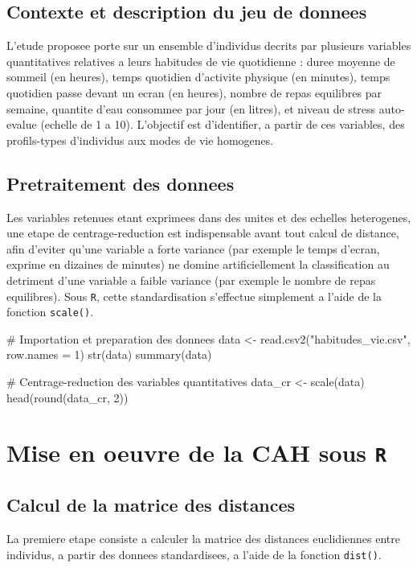 \documentclass[12pt,a4paper]{book}
\newcommand{\R}{\texttt{R}}
\begin{document}
	\section{Contexte et description du jeu de donnees}
	
	L'etude proposee porte sur un ensemble d'individus decrits par plusieurs variables quantitatives relatives a leurs habitudes de vie quotidienne : duree moyenne de sommeil (en heures), temps quotidien d'activite physique (en minutes), temps quotidien passe devant un ecran (en heures), nombre de repas equilibres par semaine, quantite d'eau consommee par jour (en litres), et niveau de stress auto-evalue (echelle de 1 a 10). L'objectif est d'identifier, a partir de ces variables, des profils-types d'individus aux modes de vie homogenes.
	
	\section{Pretraitement des donnees}
	
	Les variables retenues etant exprimees dans des unites et des echelles heterogenes, une etape de centrage-reduction est indispensable avant tout calcul de distance, afin d'eviter qu'une variable a forte variance (par exemple le temps d'ecran, exprime en dizaines de minutes) ne domine artificiellement la classification au detriment d'une variable a faible variance (par exemple le nombre de repas equilibres). Sous \R, cette standardisation s'effectue simplement a l'aide de la fonction \texttt{scale()}.
	
	\begin{Rscript}
		# Importation et preparation des donnees
		data <- read.csv2("habitudes_vie.csv", row.names = 1)
		str(data)
		summary(data)
		
		# Centrage-reduction des variables quantitatives
		data_cr <- scale(data)
		head(round(data_cr, 2))
	\end{Rscript}
	
	\chapter{Mise en oeuvre de la CAH sous \R}
	
	\section{Calcul de la matrice des distances}
	
	La premiere etape consiste a calculer la matrice des distances euclidiennes entre individus, a partir des donnees standardisees, a l'aide de la fonction \texttt{dist()}.
	
\end{document}
